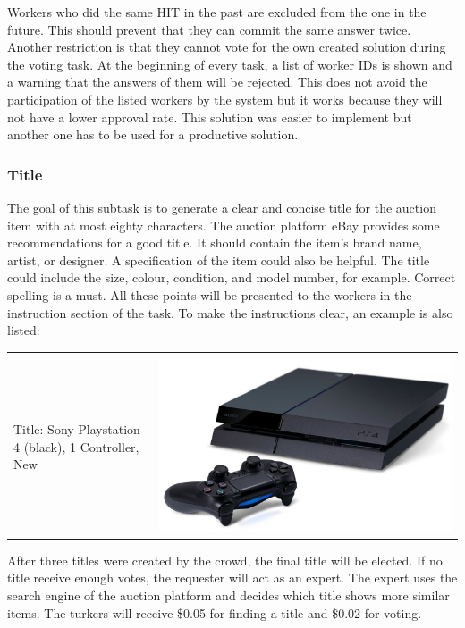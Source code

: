 Workers who did the same HIT in the past are excluded from the one in the future. This should prevent that they can commit the same answer twice. Another restriction is that they cannot vote for the own created solution during the voting task. At the beginning of every task, a list of worker IDs is shown and a warning that the answers of them will be rejected. This does not avoid the participation of the listed workers by the system but it works because they will not have a lower approval rate. This solution was easier to implement but another one has to be used for a productive solution.
\subsubsection{Title}
The goal of this subtask is to generate a clear and concise title for the auction item with at most eighty characters. The auction platform eBay provides some recommendations for a good title. It should contain the item's brand name, artist, or designer. A specification of the item could also be helpful. The title could include the size, colour, condition, and model number, for example. Correct spelling is a must. All these points will be presented to the workers in the instruction section of the task. To make the instructions clear, an example is also listed:
\begin{table}[H]
	\begin{center}
	\begin{tabular}{| p{8cm} p{5cm} |}
		\hline
		& \\
		Title: Sony Playstation 4 (black), 1 Controller, New & \includegraphics[scale=0.1]{images/ps4} \\
		\hline
	\end{tabular}
	\end{center}
\end{table}
After three titles were created by the crowd, the final title will be elected. If no title receive enough votes, the requester will act as an expert. The expert uses the search engine of the auction platform and decides which title shows more similar items. The turkers will receive \$0.05 for finding a title and \$0.02 for voting.

